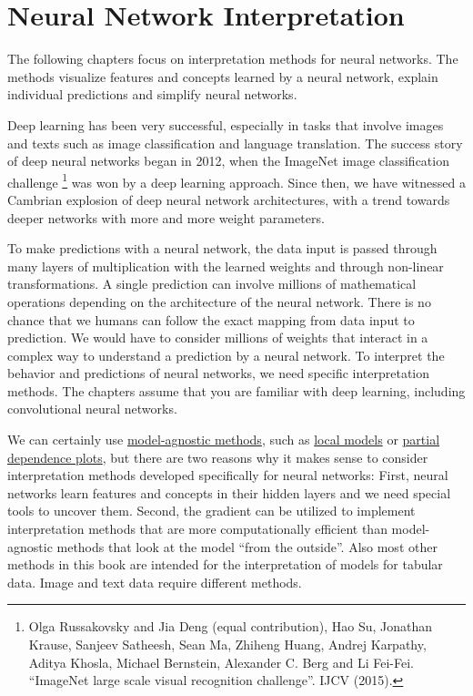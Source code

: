 \documentclass[
  11pt,
]{scrbook}
\begin{document}
\hypertarget{neural-networks}{%
\chapter{Neural Network Interpretation}\label{neural-networks}}

The following chapters focus on interpretation methods for neural networks.
The methods visualize features and concepts learned by a neural network, explain individual predictions and simplify neural networks.

Deep learning has been very successful, especially in tasks that involve images and texts such as image classification and language translation.
The success story of deep neural networks began in 2012, when the ImageNet image classification challenge \footnote{Olga Russakovsky and Jia Deng (equal contribution), Hao Su, Jonathan Krause, Sanjeev Satheesh, Sean Ma, Zhiheng Huang, Andrej Karpathy, Aditya Khosla, Michael Bernstein, Alexander C. Berg and Li Fei-Fei. ``ImageNet large scale visual recognition challenge''. IJCV (2015).} was won by a deep learning approach.
Since then, we have witnessed a Cambrian explosion of deep neural network architectures, with a trend towards deeper networks with more and more weight parameters.

To make predictions with a neural network, the data input is passed through many layers of multiplication with the learned weights and through non-linear transformations.
A single prediction can involve millions of mathematical operations depending on the architecture of the neural network.
There is no chance that we humans can follow the exact mapping from data input to prediction.
We would have to consider millions of weights that interact in a complex way to understand a prediction by a neural network.
To interpret the behavior and predictions of neural networks, we need specific interpretation methods.
The chapters assume that you are familiar with deep learning, including convolutional neural networks.

We can certainly use \protect\hyperlink{agnostic}{model-agnostic methods}, such as \protect\hyperlink{lime}{local models} or \protect\hyperlink{pdp}{partial dependence plots}, but there are two reasons why it makes sense to consider interpretation methods developed specifically for neural networks:
First, neural networks learn features and concepts in their hidden layers and we need special tools to uncover them.
Second, the gradient can be utilized to implement interpretation methods that are more computationally efficient than model-agnostic methods that look at the model ``from the outside''.
Also most other methods in this book are intended for the interpretation of models for tabular data.
Image and text data require different methods.
\end{document}

